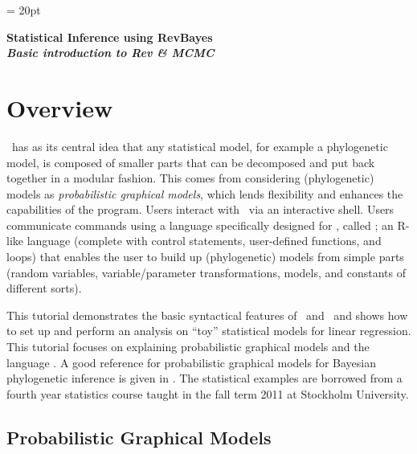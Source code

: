 \documentclass[11pt]{article}
\begin{document}
\renewcommand{\headrulewidth}{0.5pt}
\headsep = 20pt
\lhead{ }

\thispagestyle{plain}
\begin{center}

\textbf{\LARGE Statistical Inference using RevBayes}\\\vspace{2mm}
\textbf{\it{\Large Basic introduction to Rev \& MCMC}}\\\vspace{2mm}
\end{center}

\section*{Overview}

\RevBayes~has as its central idea that any statistical model, for example a phylogenetic model, is composed of smaller parts that can be decomposed and put back together in a modular fashion. This comes from considering (phylogenetic) models as \textit{probabilistic graphical models}, which lends flexibility and enhances the capabilities of the program. 
Users interact with \RevBayes~via an interactive shell.
Users communicate commands using a language specifically designed for \RevBayes, called \Rev; an R-like language (complete with control statements, user-defined functions, and loops) that enables the user to build up (phylogenetic) models from simple parts (random variables, variable/parameter transformations, models, and constants of different sorts).
 

This tutorial demonstrates the basic syntactical features of \RevBayes~and \Rev~and shows how to set up and perform an analysis on ``toy'' statistical models for linear regression. 
This tutorial focuses on explaining probabilistic graphical models and the language \Rev.
A good reference for probabilistic graphical models for Bayesian phylogenetic inference is given in  \cite{hoehnaGM2014}.
The statistical examples are borrowed from a fourth year statistics course taught in the fall term 2011 at Stockholm University.


\bigskip
\subsection*{Probabilistic Graphical Models}
\end{document}
